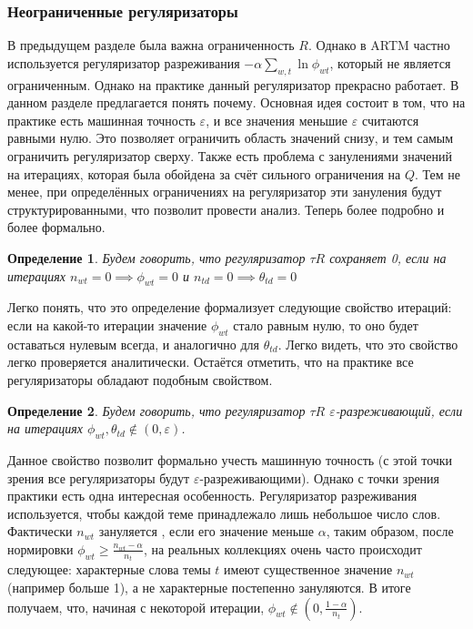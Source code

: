 \documentclass[12pt]{article}
\newtheorem{definition}{Определение}[section]
\renewcommand{\geq}{\geqslant}
\begin{document}
\subsubsection{Неограниченные регуляризаторы}
\label{subsec:unboundreg}
В предыдущем разделе была важна ограниченность $R$. Однако в ARTM частно используется регуляризатор разреживания $- \alpha \sum_{w,t}\ln \phi_{wt}$, который не является ограниченным. Однако на практике данный регуляризатор прекрасно работает. В данном разделе предлагается понять почему. Основная идея состоит в том, что на практике есть машинная точность $\varepsilon$, и все значения меньшие $\varepsilon$ считаются равными нулю. Это позволяет ограничить область значений снизу, и тем самым ограничить регуляризатор сверху. Также есть проблема с занулениями значений на итерациях, которая была обойдена за счёт сильного ограничения на $Q$. Тем не менее, при определённых  ограничениях на регуляризатор эти зануления будут структурированными, что позволит провести анализ. Теперь более подробно и более формально.
\begin{definition}
Будем говорить, что регуляризатор $\tau R$ сохраняет 0, если на итерациях $n_{wt} = 0 \implies \phi_{wt} = 0$ и $n_{td} = 0 \implies \theta_{td} = 0$
\end{definition}
Легко понять, что это определение формализует следующие свойство итераций: если на какой-то итерации значение $\phi_{wt}$ стало равным нулю, то оно будет оставаться нулевым всегда, и аналогично для $\theta_{td}$. Легко видеть, что это свойство легко проверяется аналитически. Остаётся отметить, что на практике все регуляризаторы обладают подобным свойством.
\begin{definition}
\label{sparsereg}
Будем говорить, что регуляризатор $\tau R$ $\varepsilon$-разреживающий, если на итерациях $\phi_{wt}, \theta_{td} \notin (0, \varepsilon)$.
\end{definition}
Данное свойство позволит формально учесть машинную точность (с этой точки зрения все регуляризаторы будут $\varepsilon$-разреживающими). Однако с точки зрения практики есть одна интересная особенность. Регуляризатор разреживания используется, чтобы каждой теме принадлежало лишь небольшое число слов. Фактически  $n_{wt}$ зануляется , если его значение меньше $\alpha$, таким образом, после нормировки $\phi_{wt} \geq \frac{n_{wt} - \alpha}{n_t}$,  на реальных коллекциях очень часто происходит следующее: характерные слова темы $t$ имеют существенное значение $n_{wt}$ (например больше 1), а не характерные постепенно зануляются. В итоге получаем, что, начиная с некоторой итерации, $\phi_{wt} \notin (0, \frac{1-\alpha}{n_t})$.\\
\end{document}
